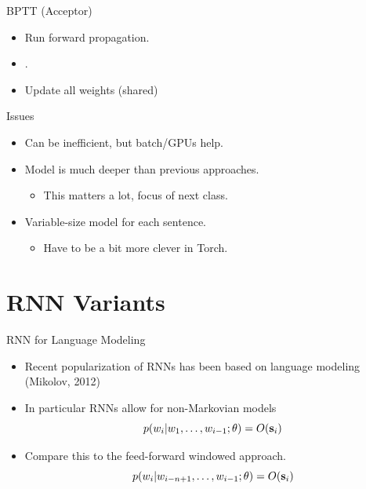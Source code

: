 \documentclass{beamer}
\begin{document}
\begin{frame}{BPTT (Acceptor)}
  \begin{itemize}
  \item \alert{Run forward propagation}.
  \item {}.
  \item Update all weights (shared)
  \end{itemize}

    \begin{center}
    \end{center}
\end{frame}

\begin{frame}{Issues}
  \begin{itemize}
  \item Can be inefficient, but batch/GPUs help.
    \air

  \item Model is much deeper than previous approaches.
    \begin{itemize}
    \item This matters a lot, focus of next class.
    \end{itemize}
    \air

  \item Variable-size model for each sentence.
    \begin{itemize}
    \item Have to be a bit more clever in Torch.
    \end{itemize}
  \end{itemize}
\end{frame}

\section{RNN Variants}

\begin{frame}{RNN for Language Modeling}
  \begin{itemize}
  \item Recent popularization of RNNs has been based on language modeling (Mikolov, 2012)
    \air

  \item In particular RNNs allow for non-Markovian models
    \[ p(w_i | w_1, \ldots, w_{i-1};\theta) = O(\mathbf{s}_i) \]

    \air 

  \item Compare this to the feed-forward windowed approach.
    \[ p(w_i | w_{i-n+1}, \ldots, w_{i-1};\theta) = O(\mathbf{s}_i) \]
  \end{itemize}
\end{frame}
\end{document}

